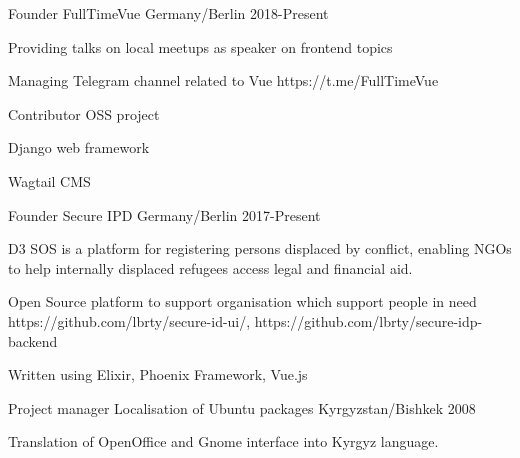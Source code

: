 \begin{cventries}
  \cventry
    {Founder}
    {FullTimeVue}
    {Germany/Berlin}
    {2018-Present}
    {
      \begin{cvitems}
        \item {Providing talks on local meetups as speaker on frontend topics}
        \item {Managing Telegram channel related to Vue https://t.me/FullTimeVue}
      \end{cvitems}
    }
  \cventry
    {Contributor}
    {OSS project}
    {}
    {}
    {
      \begin{cvitems}
        \item {Django web framework}
        \item {Wagtail CMS}
      \end{cvitems}
    }
  \cventry
    {Founder}
    {Secure IPD}
    {Germany/Berlin}
    {2017-Present}
    {
      \begin{cvitems}
        \item {D3 SOS is a platform for registering persons displaced by conflict, enabling NGOs to help internally displaced refugees access legal and financial aid.}
        \item {Open Source platform to support organisation which support people in need https://github.com/lbrty/secure-id-ui/, https://github.com/lbrty/secure-idp-backend}
        \item {Written using Elixir, Phoenix Framework, Vue.js}
      \end{cvitems}
    }
  \cventry
    {Project manager}
    {Localisation of Ubuntu packages}
    {Kyrgyzstan/Bishkek}
    {2008}
    {
      \begin{cvitems}
        \item {Translation of OpenOffice and Gnome interface into Kyrgyz language.}
      \end{cvitems}
    }
\end{cventries}
